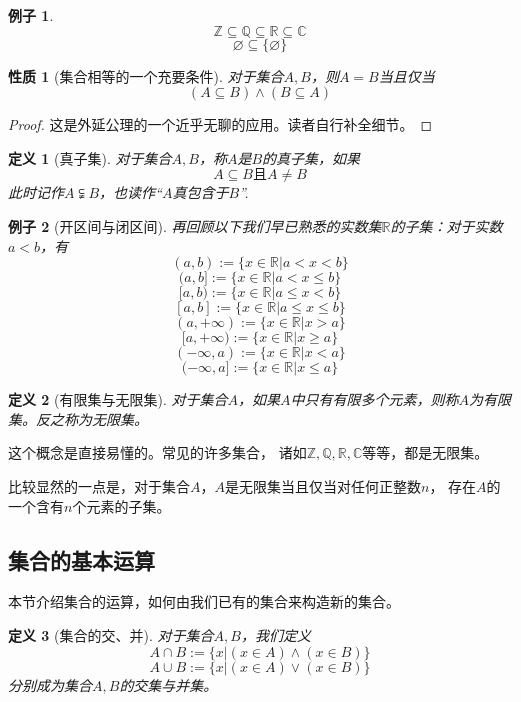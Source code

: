 \documentclass[a4paper, 11pt]{article} %
\newtheorem{prop}{性质}[subsection]
\newtheorem{definition}{定义}[subsection]
\newtheorem{example}{例子}[subsection]
\begin{document}
\begin{example}
$$\mathbb{Z}\subseteq\mathbb{Q}\subseteq\mathbb{R}\subseteq\mathbb{C}$$
$$\varnothing\subseteq\{\varnothing\}$$
\end{example}

\begin{prop}[集合相等的一个充要条件]
对于集合$A,B$，则$A=B$当且仅当
$$(A\subseteq B)\wedge(B\subseteq A)$$
\end{prop}
\begin{proof}
这是外延公理的一个近乎无聊的应用。读者自行补全细节。
\end{proof}

\begin{definition}[真子集]
对于集合$A,B$，称$A$是$B$的真子集，如果
$$A\subseteq B\text{且}A\neq B$$
此时记作$A\subsetneqq B$，也读作“$A$真包含于$B$”.
\end{definition}

\begin{example}[开区间与闭区间]
再回顾以下我们早已熟悉的实数集$\mathbb{R}$的子集：对于实数$a<b$，有
$$(a,b):=\{x\in\mathbb{R}|a<x<b\}$$
$$(a,b]:=\{x\in\mathbb{R}|a<x\leq b\}$$
$$[a,b):=\{x\in\mathbb{R}|a\leq x<b\}$$
$$[a,b]:=\{x\in\mathbb{R}|a\leq x\leq b\}$$
$$(a,+\infty):=\{x\in\mathbb{R}|x>a\}$$
$$[a,+\infty):=\{x\in\mathbb{R}|x\geq a\}$$
$$(-\infty,a):=\{x\in\mathbb{R}|x<a\}$$
$$(-\infty,a]:=\{x\in\mathbb{R}|x\leq a\}$$
\end{example}

\begin{definition}[有限集与无限集]
对于集合$A$，如果$A$中只有有限多个元素，则称$A$为有限集。反之称为无限集。
\end{definition}
这个概念是直接易懂的。常见的许多集合，
诸如$\mathbb{Z},\mathbb{Q},\mathbb{R},\mathbb{C}$等等，都是无限集。

比较显然的一点是，对于集合$A$，$A$是无限集当且仅当对任何正整数$n$，
存在$A$的一个含有$n$个元素的子集。

\subsection{集合的基本运算}

本节介绍集合的运算，如何由我们已有的集合来构造新的集合。
\begin{definition}[集合的交、并]
对于集合$A,B$，我们定义
$$A\cap B:=\{x|(x\in A)\wedge(x\in B)\}$$
$$A\cup B:=\{x|(x\in A)\vee(x\in B)\}$$
分别成为集合$A,B$的交集与并集。
\end{definition}
\end{document}
